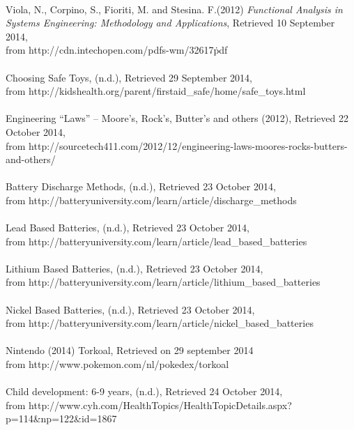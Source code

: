 \documentclass[11pt,twoside,a4paper]{report}
\begin{document}
\\
Viola, N., Corpino, S., Fioriti, M. and Stesina. F.(2012) \textit{Functional Analysis in Systems Engineering: Methodology and Applications}, Retrieved 10 September 2014, \\from http://cdn.intechopen.com/pdfs-wm/32617\.pdf \\
\\
Choosing Safe Toys, (n.d.), Retrieved 29 September 2014, \\from http://kidshealth.org/parent/firstaid\_safe/home/safe\_toys.html \\
\\
Engineering “Laws” – Moore’s, Rock’s, Butter’s and others (2012), Retrieved 22 October 2014, \\from http://sourcetech411.com/2012/12/engineering-laws-moores-rocks-butters-and-others/ \\
\\
Battery Discharge Methods, (n.d.), Retrieved 23 October 2014, \\from http://batteryuniversity.com/learn/article/discharge\_methods\\
\\
Lead Based Batteries, (n.d.), Retrieved 23 October 2014, \\from http://batteryuniversity.com/learn/article/lead\_based\_batteries \\
\\
Lithium Based Batteries, (n.d.), Retrieved 23 October 2014, \\from http://batteryuniversity.com/learn/article/lithium\_based\_batteries \\
\\
Nickel Based Batteries, (n.d.), Retrieved 23 October 2014, \\from 
http://batteryuniversity.com/learn/article/nickel\_based\_batteries \\
\\
Nintendo (2014) Torkoal, Retrieved on 29 september 2014\\ from http://www.pokemon.com/nl/pokedex/torkoal \\
\\
Child development: 6-9 years, (n.d.), Retrieved 24 October 2014, \\from http://www.cyh.com/HealthTopics/HealthTopicDetails.aspx?p=114\&np=122\&id=1867\\
\\
\end{document}
